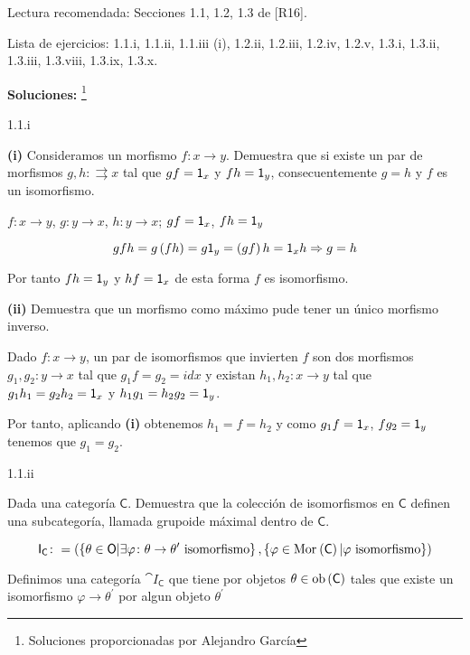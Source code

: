 Lectura recomendada: Secciones 1.1, 1.2, 1.3 de [R16].

Lista de ejercicios: 1.1.i, 1.1.ii, 1.1.iii (i), 1.2.ii, 1.2.iii, 1.2.iv, 1.2.v, 1.3.i, 1.3.ii, 1.3.iii, 1.3.viii, 1.3.ix, 1.3.x.

{\bf Soluciones: }\footnote{Soluciones proporcionadas por Alejandro García}

\begin{Ej}\label{ej:1.1.i}
   1.1.i


   {\bf (i)} Consideramos un morfismo $f \colon x \rightarrow y$. Demuestra que si existe un par de morfismos $g,h \colon \rightrightarrows x$ tal que $gf=\textup{\textsf{1}}_{x}$ y $fh=\textup{\textsf{1}}_{y}$,  consecuentemente $g=h$ y $f$ es un isomorfismo.

   $f \colon x \rightarrow y$, $g \colon y \rightarrow x$, $h \colon y \rightarrow x$; $gf=\textup{\textsf{1}}_{x}$, $fh=\textup{\textsf{1}}_{y}$ 

\begin{equation*}
gfh = g \left( fh\right) = g \textup{\textsf{1}}_{y} = \left(gf\right) h = \textup{\textsf{1}}_{x}h \Rightarrow g=h
\end{equation*}


  Por tanto $fh=\textup{\textsf{1}}_{y}$ y $hf=\textup{\textsf{1}}_{x}$ de esta forma $f$ es isomorfismo. 
  
  {\bf (ii)} Demuestra que un morfismo como máximo pude tener un único morfismo inverso.  

  Dado $f \colon x \rightarrow y$, un par de isomorfismos que invierten $f$ son dos morfismos $g_1,g_2 \colon y \rightarrow x $ tal que $g_1f=g_2=id{x}$ y existan $h_1,h_2 \colon x \rightarrow y$ tal que $g_1 h_1=g_2h_2=\textup{\textsf{1}}_{x}$ y $h_1g_1=h_2g_2=\textup{\textsf{1}}_{y}$. 

  Por tanto, aplicando {\bf (i)} obtenemos $h_1=f=h_2$ y como $g_1f=\textup{\textsf{1}}_{x}$, $fg_2=\textup{\textsf{1}}_{y}$ tenemos que $g_1=g_2$.



\end{Ej}


\begin{Ej}\label{ej:1.1.ii}
1.1.ii  

  Dada una categoría $\mathsf{C}$. Demuestra que la colección de isomorfismos en $\mathsf{C}$ definen una subcategoría, llamada grupoide máximal dentro de $\mathsf{C}$.

  \[
    \textup{\textsf{I}}_{\mathsf{C}}\colon = \left( \left\{\theta \in \textup{\textsf{O}} | \exists \varphi \colon \theta \rightarrow \theta^{\prime} \text{ isomorfismo} \right\}, \left\{\varphi \in \operatorname{\mathrm{Mor}}_{}\left(\mathsf{C}\right)| \varphi \text{ isomorfismo} \right\}\right)
  \]

  Definimos una categoría $\cat{I}_{\mathsf{C}}$ que tiene por objetos $\theta \in \mathrm{ob} \left(\mathsf{C}\right)$ tales que existe un isomorfismo $\varphi \rightarrow \theta^{\prime}$ por algun objeto $\theta^{\prime}$ 
  

\end{Ej}



